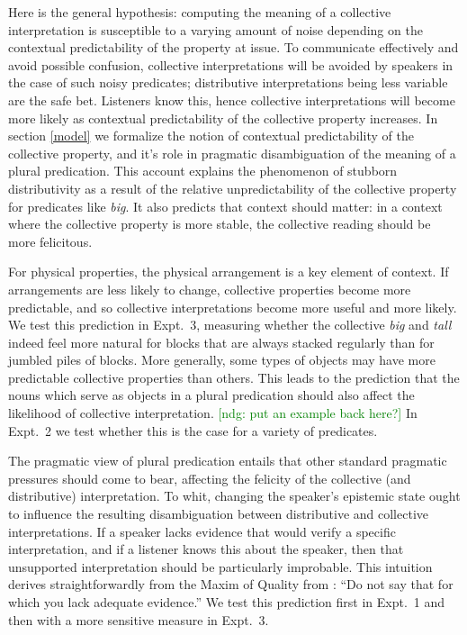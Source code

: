 \documentclass[linguex]{sp}
\newcommand{\ndg}[1]{\textcolor{Green}{[ndg: #1]}}
\begin{document}
Here is the general hypothesis: computing the meaning of a collective interpretation is susceptible to a varying amount of noise depending on the contextual predictability of the property at issue.
To communicate effectively and avoid possible confusion, collective interpretations will be avoided by speakers in the case of such noisy predicates; distributive interpretations being less variable are the safe bet. 
Listeners know this, hence collective interpretations will become more likely as contextual predictability of the collective property increases.
In section \ref{model} we formalize the notion of contextual predictability of the collective property, and it's role in pragmatic disambiguation of the meaning of a plural predication.
This account explains the phenomenon of stubborn distributivity as a result of the relative unpredictability of the collective property for predicates like \emph{big}.
It also predicts that context should matter: in a context where the collective property is more stable, the collective reading should be more felicitous.

 
For physical properties, the physical arrangement is a key element of context. If arrangements are less likely to change, collective properties become more predictable, and so collective interpretations become more useful and more likely. 
We test this prediction in Expt.~3, measuring whether the collective \emph{big} and \emph{tall} indeed feel more natural for blocks that are always stacked regularly than for jumbled piles of blocks.
More generally, some types of objects may have more predictable collective properties than others.
This leads to the prediction that the nouns which serve as objects in a plural predication should also affect the likelihood of collective interpretation. \ndg{put an example back here?}
In Expt.~2 we test whether this is the case for a variety of predicates.

The pragmatic view of plural predication entails that other standard pragmatic pressures should come to bear, affecting the felicity of the collective (and distributive) interpretation.
To whit, changing the speaker's epistemic state ought to influence the resulting disambiguation between distributive and collective interpretations. 
If a speaker lacks evidence that would verify a specific interpretation, and if a listener knows this about the speaker, then that unsupported interpretation should be particularly improbable. This intuition derives straightforwardly from the Maxim of Quality from \cite{grice1975}: ``Do not say that for which you lack adequate evidence.'' 
We test this prediction first in Expt.~1 and then with a more sensitive measure in Expt.~3.
\end{document}
